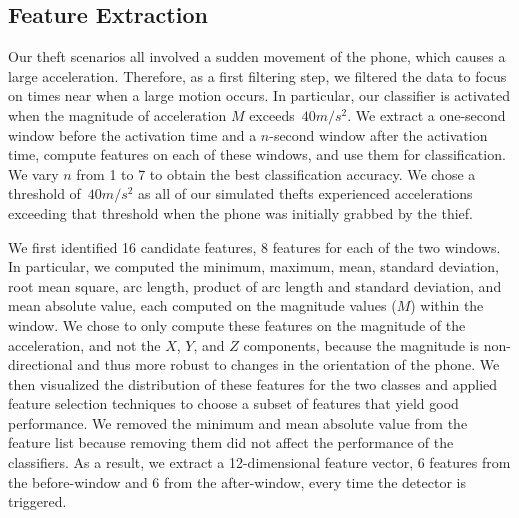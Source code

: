 \subsection{Feature Extraction}
\label{s:features}

Our theft scenarios all involved a sudden movement of the phone, which causes a large acceleration.
Therefore, as a first filtering step, we filtered the data to focus on times near when a large motion occurs.
In particular, our classifier is activated when the magnitude of acceleration $M$ exceeds~$40 m/s^2$.
We extract a one-second window before the activation time and a $n$-second window after the activation time, compute features on each of these windows, and use them for classification.
We vary $n$ from 1 to 7 to obtain the best classification accuracy.
We chose a threshold of~$40 m/s^2$ as all of our simulated thefts experienced accelerations exceeding that threshold when the phone was initially grabbed by the thief.

We first identified 16 candidate features, 8 features for each of the two windows.
In particular, we computed the minimum, maximum, mean, standard deviation, root mean square, arc length, product of arc length and standard deviation, and mean absolute value, each computed on the magnitude values ($M$) within the window.
We chose to only compute these features on the magnitude of the acceleration, and not the $X$, $Y$, and $Z$ components, because the magnitude is non-directional and thus more robust to changes in the orientation of the phone.
We then visualized the distribution of these features for the two classes and applied feature selection techniques to choose a subset of features that yield good performance.
We removed the minimum and mean absolute value from the feature list because removing them did not affect the performance of the classifiers.
As a result, we extract a 12-dimensional feature vector, 6 features from the before-window and 6 from the after-window, every time the detector is triggered.

